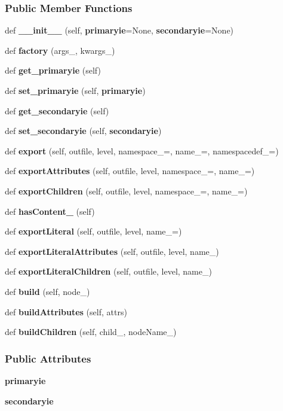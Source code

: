 \subsubsection*{Public Member Functions}
\begin{DoxyCompactItemize}
\item 
def {\bf \+\_\+\+\_\+init\+\_\+\+\_\+} (self, {\bf primaryie}=None, {\bf secondaryie}=None)
\item 
def {\bf factory} (args\+\_\+, kwargs\+\_\+)
\item 
def {\bf get\+\_\+primaryie} (self)
\item 
def {\bf set\+\_\+primaryie} (self, {\bf primaryie})
\item 
def {\bf get\+\_\+secondaryie} (self)
\item 
def {\bf set\+\_\+secondaryie} (self, {\bf secondaryie})
\item 
def {\bf export} (self, outfile, level, namespace\+\_\+=\textquotesingle{}\textquotesingle{}, name\+\_\+=\textquotesingle{}, namespacedef\+\_\+=\textquotesingle{}\textquotesingle{})
\item 
def {\bf export\+Attributes} (self, outfile, level, namespace\+\_\+=\textquotesingle{}\textquotesingle{}, name\+\_\+=\textquotesingle{})
\item 
def {\bf export\+Children} (self, outfile, level, namespace\+\_\+=\textquotesingle{}\textquotesingle{}, name\+\_\+=\textquotesingle{})
\item 
def {\bf has\+Content\+\_\+} (self)
\item 
def {\bf export\+Literal} (self, outfile, level, name\+\_\+=\textquotesingle{})
\item 
def {\bf export\+Literal\+Attributes} (self, outfile, level, name\+\_\+)
\item 
def {\bf export\+Literal\+Children} (self, outfile, level, name\+\_\+)
\item 
def {\bf build} (self, node\+\_\+)
\item 
def {\bf build\+Attributes} (self, attrs)
\item 
def {\bf build\+Children} (self, child\+\_\+, node\+Name\+\_\+)
\end{DoxyCompactItemize}
\subsubsection*{Public Attributes}
\begin{DoxyCompactItemize}
\item 
{\bf primaryie}
\item 
{\bf secondaryie}
\end{DoxyCompactItemize}
